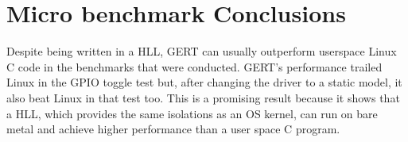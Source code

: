 

\section{Micro benchmark Conclusions}

Despite being written in a HLL, GERT can usually outperform userspace
Linux C code in the benchmarks that were conducted. GERT's performance trailed
Linux in the GPIO toggle test but, after changing the driver to a static model,
it also beat Linux in that test too. This is a promising result because it shows
that a HLL, which provides the same isolations as an OS kernel, can run on bare metal
and achieve higher performance than a user space C program.


